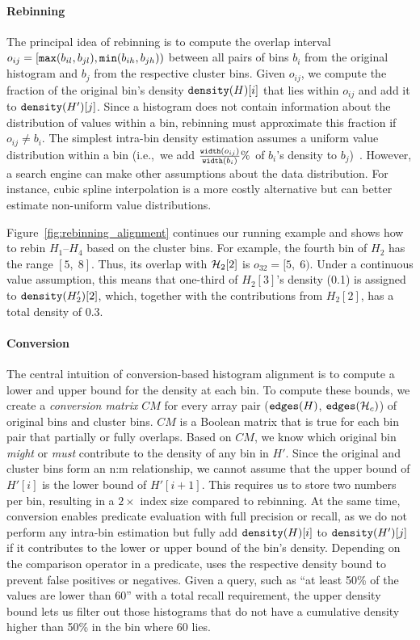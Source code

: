 \paragraph{Rebinning}
The principal idea of rebinning is to compute the overlap interval $o_{ij} = [\FuncSty{max}(b_{il}, b_{jl}), \FuncSty{min}(b_{ih}, b_{jh}))$ between all pairs of bins $b_i$ from the original histogram and $b_j$ from the respective cluster bins.
Given $o_{ij}$, we compute the fraction of the original bin's density $\density{H}[i]$ that lies within $o_{ij}$ and add it to $\density{H'}[j]$.
Since a histogram does not contain information about the distribution of values within a bin, rebinning must approximate this fraction if $o_{ij} \neq b_i$.
The simplest intra-bin density estimation assumes a uniform value distribution within a bin (i.e.,~we add $\tfrac{\FuncSty{width}(o_{ij})}{\FuncSty{width}(b_i)}\%$ of $b_i$'s density to $b_j$)~\cite{cormode_synopses_2011}.
However, a search engine can make other assumptions about the data distribution.
For instance, cubic spline interpolation is a more costly alternative but can better estimate non-uniform value distributions.

Figure~\ref{fig:rebinning_alignment} continues our running example and shows how to rebin $H_1$--$H_4$ based on the cluster bins.
For example, the fourth bin of $H_2$ has the range $[5,\;8]$.
Thus, its overlap with $\mathcal{H}_2[2]$ is $o_{32} = [5,\;6)$.
Under a continuous value assumption, this means that one-third of $H_2[3]$'s density (0.1) is assigned to $\density{H'_2}[2]$, which, together with the contributions from $H_2[2]$, has a total density of 0.3.

\paragraph{Conversion}

The central intuition of conversion-based histogram alignment is to compute a lower and upper bound for the density at each bin.
To compute these bounds, we create a \textit{conversion matrix} $CM$ for every array pair ($\edges{H}$, $\edges{\cH_c}$) of original bins and cluster bins.
$CM$ is a Boolean matrix that is true for each bin pair that partially or fully overlaps.
Based on $CM$, we know which original bin \textit{might} or \textit{must} contribute to the density of any bin in $H'$.
Since the original and cluster bins form an n:m relationship, we cannot assume that the upper bound of $H'[i]$ is the lower bound of $H'[i+1]$.
This requires us to store two numbers per bin, resulting in a $2\times$ index size compared to rebinning.
At the same time, conversion enables predicate evaluation with full precision or recall, as we do not perform any intra-bin estimation but fully add $\density{H}[i]$ to $\density{H'}[j]$ if it contributes to the lower or upper bound of the bin's density.
Depending on the comparison operator in a predicate, \system{} uses the respective density bound to prevent false positives or negatives.
Given a query, such as ``at least 50\% of the values are lower than 60'' with a total recall requirement, the upper density bound lets us filter out those histograms that do not have a cumulative density higher than 50\% in the bin where 60 lies.

